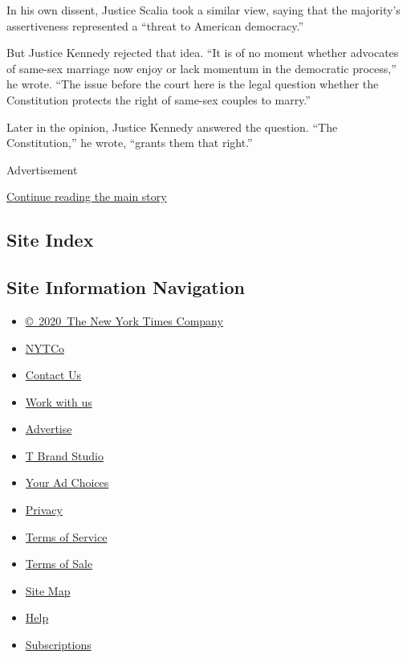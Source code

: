 In his own dissent, Justice Scalia took a similar view, saying that the
majority's assertiveness represented a ``threat to American democracy.''

But Justice Kennedy rejected that idea. ``It is of no moment whether
advocates of same-sex marriage now enjoy or lack momentum in the
democratic process,'' he wrote. ``The issue before the court here is the
legal question whether the Constitution protects the right of same-sex
couples to marry.''

Later in the opinion, Justice Kennedy answered the question. ``The
Constitution,'' he wrote, ``grants them that right.''

Advertisement

\protect\hyperlink{after-bottom}{Continue reading the main story}

\hypertarget{site-index}{%
\subsection{Site Index}\label{site-index}}

\hypertarget{site-information-navigation}{%
\subsection{Site Information
Navigation}\label{site-information-navigation}}

\begin{itemize}
\tightlist
\item
  \href{https://help.nytimes3xbfgragh.onion/hc/en-us/articles/115014792127-Copyright-notice}{©~2020~The
  New York Times Company}
\end{itemize}

\begin{itemize}
\tightlist
\item
  \href{https://www.nytco.com/}{NYTCo}
\item
  \href{https://help.nytimes3xbfgragh.onion/hc/en-us/articles/115015385887-Contact-Us}{Contact
  Us}
\item
  \href{https://www.nytco.com/careers/}{Work with us}
\item
  \href{https://nytmediakit.com/}{Advertise}
\item
  \href{http://www.tbrandstudio.com/}{T Brand Studio}
\item
  \href{https://www.nytimes3xbfgragh.onion/privacy/cookie-policy\#how-do-i-manage-trackers}{Your
  Ad Choices}
\item
  \href{https://www.nytimes3xbfgragh.onion/privacy}{Privacy}
\item
  \href{https://help.nytimes3xbfgragh.onion/hc/en-us/articles/115014893428-Terms-of-service}{Terms
  of Service}
\item
  \href{https://help.nytimes3xbfgragh.onion/hc/en-us/articles/115014893968-Terms-of-sale}{Terms
  of Sale}
\item
  \href{https://spiderbites.nytimes3xbfgragh.onion}{Site Map}
\item
  \href{https://help.nytimes3xbfgragh.onion/hc/en-us}{Help}
\item
  \href{https://www.nytimes3xbfgragh.onion/subscription?campaignId=37WXW}{Subscriptions}
\end{itemize}
